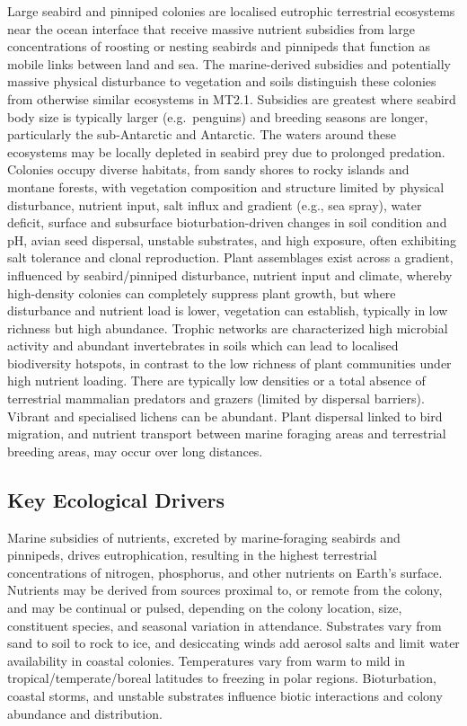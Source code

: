 \documentclass[
  letterpaper,
  DIV=11,
  numbers=noendperiod]{scrartcl}
\begin{document}
Large seabird and pinniped colonies are localised eutrophic terrestrial
ecosystems near the ocean interface that receive massive nutrient
subsidies from large concentrations of roosting or nesting seabirds and
pinnipeds that function as mobile links between land and sea. The
marine-derived subsidies and potentially massive physical disturbance to
vegetation and soils distinguish these colonies from otherwise similar
ecosystems in MT2.1. Subsidies are greatest where seabird body size is
typically larger (e.g.~penguins) and breeding seasons are longer,
particularly the sub-Antarctic and Antarctic. The waters around these
ecosystems may be locally depleted in seabird prey due to prolonged
predation. Colonies occupy diverse habitats, from sandy shores to rocky
islands and montane forests, with vegetation composition and structure
limited by physical disturbance, nutrient input, salt influx and
gradient (e.g., sea spray), water deficit, surface and subsurface
bioturbation-driven changes in soil condition and pH, avian seed
dispersal, unstable substrates, and high exposure, often exhibiting salt
tolerance and clonal reproduction. Plant assemblages exist across a
gradient, influenced by seabird/pinniped disturbance, nutrient input and
climate, whereby high-density colonies can completely suppress plant
growth, but where disturbance and nutrient load is lower, vegetation can
establish, typically in low richness but high abundance. Trophic
networks are characterized high microbial activity and abundant
invertebrates in soils which can lead to localised biodiversity
hotspots, in contrast to the low richness of plant communities under
high nutrient loading. There are typically low densities or a total
absence of terrestrial mammalian predators and grazers (limited by
dispersal barriers). Vibrant and specialised lichens can be abundant.
Plant dispersal linked to bird migration, and nutrient transport between
marine foraging areas and terrestrial breeding areas, may occur over
long distances.

\subsection{Key Ecological Drivers}\label{key-ecological-drivers-57}

Marine subsidies of nutrients, excreted by marine-foraging seabirds and
pinnipeds, drives eutrophication, resulting in the highest terrestrial
concentrations of nitrogen, phosphorus, and other nutrients on Earth's
surface. Nutrients may be derived from sources proximal to, or remote
from the colony, and may be continual or pulsed, depending on the colony
location, size, constituent species, and seasonal variation in
attendance. Substrates vary from sand to soil to rock to ice, and
desiccating winds add aerosol salts and limit water availability in
coastal colonies. Temperatures vary from warm to mild in
tropical/temperate/boreal latitudes to freezing in polar regions.
Bioturbation, coastal storms, and unstable substrates influence biotic
interactions and colony abundance and distribution.
\end{document}
